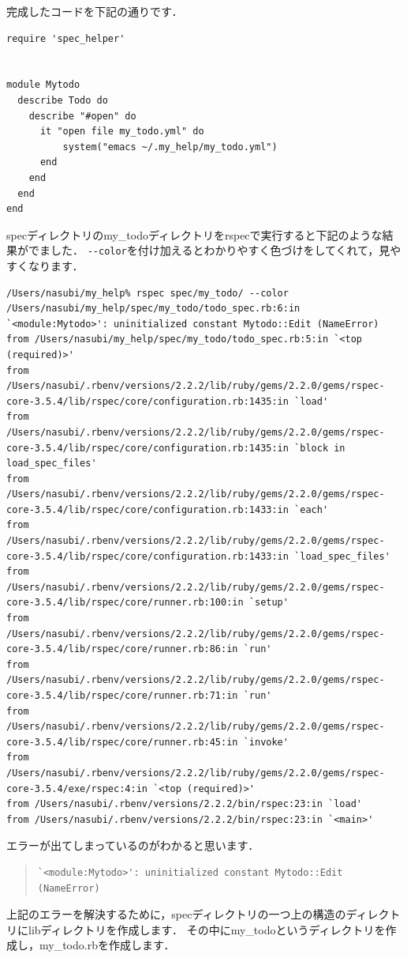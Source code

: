 完成したコードを下記の通りです．
\begin{lstlisting}[style=customRuby,basicstyle={\scriptsize\ttfamily}]
require 'spec_helper'


module Mytodo
  describe Todo do
    describe "#open" do
      it "open file my_todo.yml" do
          system("emacs ~/.my_help/my_todo.yml")
      end
    end
  end
end

\end{lstlisting}
specディレクトリのmy\_todoディレクトリをrspecで実行すると下記のような結果がでました．
\verb|--color|を付け加えるとわかりやすく色づけをしてくれて，見やすくなります．
\begin{lstlisting}[style=customCsh,basicstyle={\scriptsize\ttfamily}]
/Users/nasubi/my_help% rspec spec/my_todo/ --color
/Users/nasubi/my_help/spec/my_todo/todo_spec.rb:6:in `<module:Mytodo>': uninitialized constant Mytodo::Edit (NameError)
from /Users/nasubi/my_help/spec/my_todo/todo_spec.rb:5:in `<top (required)>'
from /Users/nasubi/.rbenv/versions/2.2.2/lib/ruby/gems/2.2.0/gems/rspec-core-3.5.4/lib/rspec/core/configuration.rb:1435:in `load'
from /Users/nasubi/.rbenv/versions/2.2.2/lib/ruby/gems/2.2.0/gems/rspec-core-3.5.4/lib/rspec/core/configuration.rb:1435:in `block in load_spec_files'
from /Users/nasubi/.rbenv/versions/2.2.2/lib/ruby/gems/2.2.0/gems/rspec-core-3.5.4/lib/rspec/core/configuration.rb:1433:in `each'
from /Users/nasubi/.rbenv/versions/2.2.2/lib/ruby/gems/2.2.0/gems/rspec-core-3.5.4/lib/rspec/core/configuration.rb:1433:in `load_spec_files'
from /Users/nasubi/.rbenv/versions/2.2.2/lib/ruby/gems/2.2.0/gems/rspec-core-3.5.4/lib/rspec/core/runner.rb:100:in `setup'
from /Users/nasubi/.rbenv/versions/2.2.2/lib/ruby/gems/2.2.0/gems/rspec-core-3.5.4/lib/rspec/core/runner.rb:86:in `run'
from /Users/nasubi/.rbenv/versions/2.2.2/lib/ruby/gems/2.2.0/gems/rspec-core-3.5.4/lib/rspec/core/runner.rb:71:in `run'
from /Users/nasubi/.rbenv/versions/2.2.2/lib/ruby/gems/2.2.0/gems/rspec-core-3.5.4/lib/rspec/core/runner.rb:45:in `invoke'
from /Users/nasubi/.rbenv/versions/2.2.2/lib/ruby/gems/2.2.0/gems/rspec-core-3.5.4/exe/rspec:4:in `<top (required)>'
from /Users/nasubi/.rbenv/versions/2.2.2/bin/rspec:23:in `load'
from /Users/nasubi/.rbenv/versions/2.2.2/bin/rspec:23:in `<main>'
\end{lstlisting}
エラーが出てしまっているのがわかると思います．
\begin{quote}\begin{verbatim}
`<module:Mytodo>': uninitialized constant Mytodo::Edit (NameError)
\end{verbatim}\end{quote}
上記のエラーを解決するために，specディレクトリの一つ上の構造のディレクトリにlibディレクトリを作成します．
その中にmy\_todoというディレクトリを作成し，my\_todo.rbを作成します．

